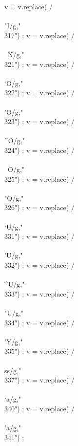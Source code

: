 {      v = v.replace(  /\\\\"I/g,"\\317") ;
      v = v.replace(  /\\\\~N/g,"\\321") ;
      v = v.replace(  /\\\\`O/g,"\\322") ;
      v = v.replace(  /\\\\'O/g,"\\323") ;
      v = v.replace(  /\\\\^O/g,"\\324") ;
      v = v.replace(  /\\\\~O/g,"\\325") ;
      v = v.replace(  /\\\\"O/g,"\\326") ;
      v = v.replace(  /\\\\`U/g,"\\331") ;
      v = v.replace(  /\\\\'U/g,"\\332") ;
      v = v.replace(  /\\\\^U/g,"\\333") ;
      v = v.replace(  /\\\\"U/g,"\\334") ;
      v = v.replace(  /\\\\'Y/g,"\\335") ;
      v = v.replace(  /\\\\ss/g,"\\337") ;
      v = v.replace(  /\\\\`a/g,"\\340") ;
      v = v.replace(  /\\\\'a/g,"\\341") ;
}
